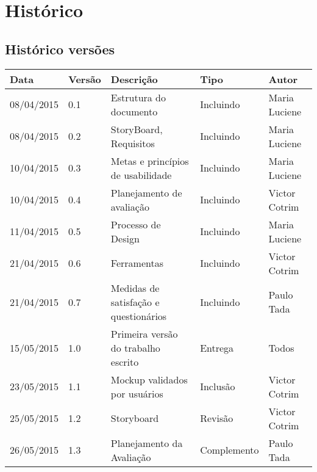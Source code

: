 \chapter[Histórico]{Histórico}

\section{Histórico versões}

\begin{table}[h]
	\centering
	\begin{tabular}{|l|l|l|l|l|}
		\hline
		Data & Versão & Descrição & Tipo & Autor \\ \hline
		08/04/2015 & 0.1 & Estrutura do documento & Incluindo & Maria Luciene \\ \hline
		08/04/2015 & 0.2 & StoryBoard, Requisitos & Incluindo & Maria Luciene \\ \hline
		10/04/2015 & 0.3 & Metas e princípios de usabilidade & Incluindo & Maria Luciene \\ \hline
		10/04/2015 & 0.4 & Planejamento de avaliação & Incluindo & Victor Cotrim \\ \hline
		11/04/2015 & 0.5 & Processo de Design & Incluindo & Maria Luciene \\ \hline	
		21/04/2015 & 0.6 & Ferramentas & Incluindo & Victor Cotrim \\ \hline
		21/04/2015 & 0.7 & Medidas de satisfação e questionários & Incluindo & Paulo Tada \\ \hline
		15/05/2015 & 1.0 & Primeira versão do trabalho escrito & Entrega & Todos \\ \hline
		23/05/2015 & 1.1 & Mockup validados por usuários & Inclusão & Victor Cotrim \\ \hline
		25/05/2015 & 1.2 & Storyboard & Revisão & Victor Cotrim \\ \hline
		26/05/2015 & 1.3 & Planejamento da Avaliação & Complemento & Paulo Tada \\ \hline


	\end{tabular}
\end{table}
